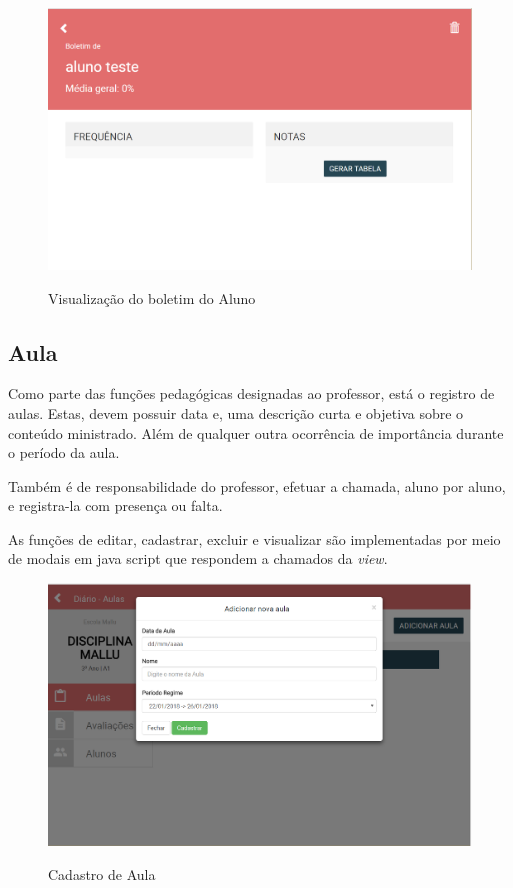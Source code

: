 \begin{figure}[!htb]
	\centering
	\caption{Visualização do boletim do Aluno } %
	\includegraphics[scale=0.4]{boletimAluno}\\  %
	{\small } %
	\label{boletimAluno} %
\end{figure}

\subsection{Aula}

Como parte das funções pedagógicas designadas ao professor, está o registro de aulas. Estas, devem possuir data e, uma descrição curta e objetiva sobre o conteúdo ministrado. Além de qualquer outra ocorrência de importância durante o período da aula.

Também é de responsabilidade do professor, efetuar a chamada, aluno por aluno, e registra-la com presença ou falta.

As funções de editar, cadastrar, excluir e visualizar são implementadas por meio de modais em java script que respondem a chamados da \textit{view}.


\begin{figure}[!htb]
	\centering
	\caption{Cadastro de Aula} %
	\includegraphics[scale=0.4]{cadastrarAula}\\  %
	{\small } %
	\label{fig:cadastrarAula} %
\end{figure}

